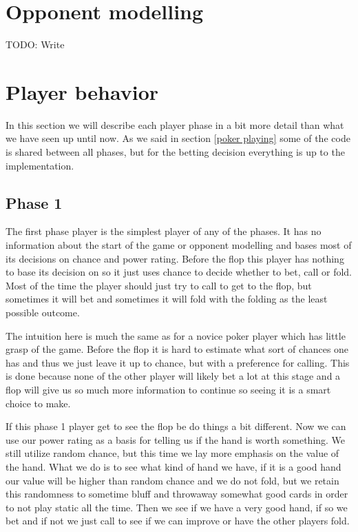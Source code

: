 \documentclass[titlepage, a4paper]{article}
\begin{document}
\section{Opponent modelling}\label{opponent modelling}
TODO: Write

\section{Player behavior}\label{player behavior}
In this section we will describe each player phase in a bit more detail than what
we have seen up until now. As we said in section \ref{poker playing} some of the
code is shared between all phases, but for the betting decision everything is
up to the implementation.

\subsection{Phase 1}\label{phase 1 player}
The first phase player is the simplest player of any of the phases. It has no 
information about the start of the game or opponent modelling and bases most
of its decisions on chance and power rating. Before the flop this player
has nothing to base its decision on so it just uses chance to decide whether
to bet, call or fold. Most of the time the player should just try to call to
get to the flop, but sometimes it will bet and sometimes it will fold with the folding
as the least possible outcome.

The intuition here is much the same as for a novice poker player which has little
grasp of the game. Before the flop it is hard to estimate what sort of chances
one has and thus we just leave it up to chance, but with a preference for calling.
This is done because none of the other player will likely bet a lot at this stage
and a flop will give us so much more information to continue so seeing it is a 
smart choice to make.

If this phase 1 player get to see the flop be do things a bit different. Now we
can use our power rating as a basis for telling us if the hand is worth something.
We still utilize random chance, but this time we lay more emphasis on the value
of the hand. What we do is to see what kind of hand we have, if it is a good hand
our value will be higher than random chance and we do not fold, but we retain this
randomness to sometime bluff and throwaway somewhat good cards in order to not
play static all the time. Then we see if we have a very good hand, if so we bet and
if not we just call to see if we can improve or have the other players fold.
\end{document}

